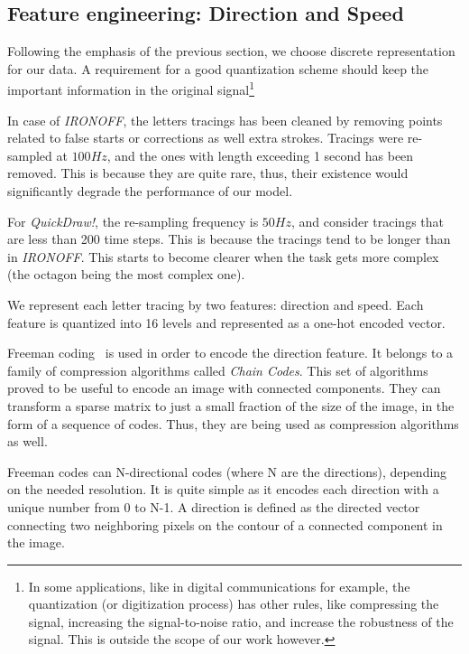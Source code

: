   \subsection{Feature engineering: Direction and Speed}
    \par Following the emphasis of the previous section, we choose discrete representation for our data. A requirement for a good quantization scheme should keep the important information in the original signal\footnote{In some applications, like in digital communications for example, the quantization (or digitization process) has other rules, like compressing the signal, increasing the signal-to-noise ratio, and increase the robustness of the signal. This is outside the scope of our work however.}

    \par In case of \textit{IRONOFF}, the letters tracings has been cleaned by removing points related to false starts or corrections as well extra strokes. Tracings were re-sampled at $100 Hz$, and the ones with length exceeding 1 second has been removed. This is because they are quite rare, thus, their existence would significantly degrade the performance of our model.

    \par For \textit{QuickDraw!}, the re-sampling frequency is $50 Hz$, and consider tracings that are less than 200 time steps. This is because the tracings tend to be longer than in \textit{IRONOFF}. This starts to become clearer when the task gets more complex (the octagon being the most complex one).

    \par We represent each letter tracing by two features: direction and speed. Each feature is quantized into 16 levels and represented as a one-hot encoded vector.

    \par Freeman coding~\citep{freeman1961encoding} is used in order to encode the direction feature. It belongs to a family of compression algorithms called \textit{Chain Codes}. This set of algorithms proved to be useful to encode an image with connected components. They can transform a sparse matrix to just a small fraction of the size of the image, in the form of a sequence of codes. Thus, they are being used as compression algorithms as well.

    \par Freeman codes can N-directional codes (where N are the directions), depending on the needed resolution. It is quite simple as it encodes each direction with a unique number from 0 to N-1. A direction is defined as the directed vector connecting two neighboring pixels on the contour of a connected component in the image.

